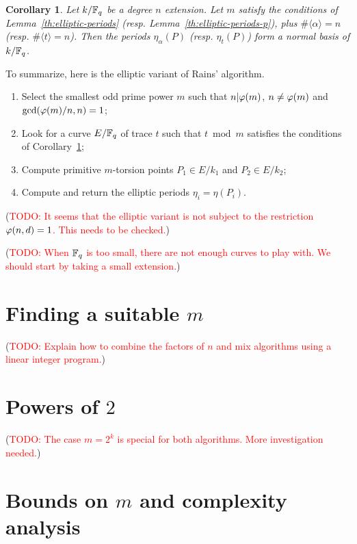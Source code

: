 \documentclass{article}
\newcommand{\todo}[1]{(\textcolor{red}{TODO: #1})}
\newtheorem{Coro}{Corollary}
\begin{document}
\begin{Coro}
  \label{th:elliptic-rains}
  Let $k/\mathbb{F}_q$ be a degree $n$ extension. Let $m$ satisfy the
  conditions of Lemma~\ref{th:elliptic-periods}
  (resp. Lemma~\ref{th:elliptic-periods-p}), plus $\#\langle
  \alpha\rangle = n$ (resp. $\#\langle t\rangle=n$).  Then the periods
  $\eta_\alpha(P)$ (resp. $\eta_t(P)$) form a normal basis of
  $k/\mathbb{F}_q$.
\end{Coro}

To summarize, here is the elliptic variant of Rains' algorithm.

\begin{enumerate}
\item Select the smallest odd prime power $m$ such that $n|\varphi(m)$,
  $n\ne\varphi(m)$ and $\gcd(\varphi(m)/n,n)=1$;
\item Look for a curve $E/\mathbb{F}_q$ of trace $t$ such that $t\bmod m$
  satisfies the conditions of Corollary~\ref{th:elliptic-rains};
\item Compute primitive $m$-torsion points $P_1\in E/k_1$ and
  $P_2\in E/k_2$;
\item Compute and return the elliptic periods $\eta_i=\eta(P_i)$.
\end{enumerate}

\todo{It seems that the elliptic variant is not subject to the
  restriction $\varphi(n,d)=1$. This needs to be checked.}

\todo{When $\mathbb{F}_q$ is too small, there are not enough curves to play
  with. We should start by taking a small extension.}

\section{Finding a suitable $m$}

\todo{Explain how to combine the factors of $n$ and mix algorithms
  using a linear integer program.}

\section{Powers of $2$}

\todo{The case $m=2^k$ is special for both algorithms. More
  investigation needed.}


\section{Bounds on $m$ and complexity analysis}
\end{document}
